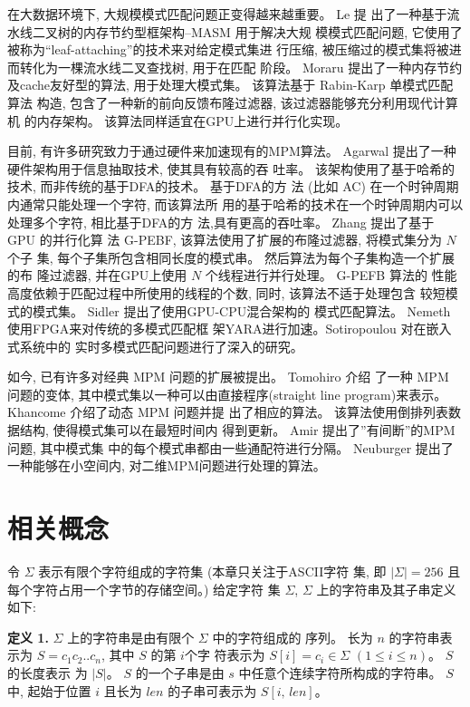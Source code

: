 在大数据环境下, 大规模模式匹配问题正变得越来越重要。 Le \cite{Le2013}提
出了一种基于流水线二叉树的内存节约型框架构--\textsf{MASM} 用于解决大规
模模式匹配问题, 它使用了被称为“leaf-attaching”的技术来对给定模式集进
行压缩, 被压缩过的模式集将被进而转化为一棵流水线二叉查找树, 用于在匹配
阶段。 Moraru \cite{Moraru2012} 提出了一种内存节约及cache友好型的算法,
用于处理大模式集。 该算法基于 Rabin-Karp \cite{Karp1987} 单模式匹配算法
构造, 包含了一种新的前向反馈布隆过滤器, 该过滤器能够充分利用现代计算机
的内存架构。 该算法同样适宜在GPU上进行并行化实现。

目前, 有许多研究致力于通过硬件来加速现有的MPM算法。 Agarwal
\cite{Agarwal2013} 提出了一种硬件架构用于信息抽取技术, 使其具有较高的吞
吐率。 该架构使用了基于哈希的技术, 而非传统的基于DFA的技术。 基于DFA的方
法 (比如 \textsf{AC}) 在一个时钟周期内通常只能处理一个字符, 而该算法所
用的基于哈希的技术在一个时钟周期内可以处理多个字符, 相比基于DFA的方
法,具有更高的吞吐率。 Zhang \cite{Zhang2015} 提出了基于 GPU 的并行化算
法 \textsf{G-PEBF}, 该算法使用了扩展的布隆过滤器, 将模式集分为 $N$ 个子
集, 每个子集所包含相同长度的模式串。 然后算法为每个子集构造一个扩展的布
隆过滤器, 并在GPU上使用 $N$ 个线程进行并行处理。 \textsf{G-PEFB} 算法的
性能高度依赖于匹配过程中所使用的线程的个数, 同时, 该算法不适于处理包含
较短模式的模式集。 Sidler \cite{Sidler2017} 提出了使用GPU-CPU混合架构的
模式匹配算法。 Nemeth \cite{Nemeth2016} 使用FPGA来对传统的多模式匹配框
架YARA进行加速。Sotiropoulou \cite{Sotiropoulou2017} 对在嵌入式系统中的
实时多模式匹配问题进行了深入的研究。

如今, 已有许多对经典 MPM 问题的扩展被提出。 Tomohiro \cite{I2015} 介绍
了一种 MPM 问题的变体, 其中模式集以一种可以由直接程序(straight line
program)来表示。  Khancome \cite{Khancome2013} 介绍了动态 MPM 问题并提
出了相应的算法。 该算法使用倒排列表数据结构, 使得模式集可以在最短时间内
得到更新。 Amir \cite{Amir2015} 提出了”有间断”的MPM 问题, 其中模式集
中的每个模式串都由一些通配符进行分隔。 Neuburger \cite{Neuburger2012}
提出了一种能够在小空间内, 对二维MPM问题进行处理的算法。

\section{相关概念}
\label{sec:notations}

令 $\Sigma$ 表示有限个字符组成的字符集 (本章只关注于ASCII字符
集, 即 $|\Sigma| = 256$ 且每个字符占用一个字节的存储空间。)  给定字符
集 $\Sigma$, $\Sigma$ 上的字符串及其子串定义如下:

\textbf{定义 1.}  $\Sigma$ 上的字符串是由有限个 $\Sigma$ 中的字符组成的
序列。 长为 $n$ 的字符串表示为 $S = c_1c_2..c_n$, 其中 $S$ 的第 $i$个字
符表示为 $S[i] = c_i \in \Sigma$ $(1 \leq i \leq n)$。  $S$ 的长度表示
为 $|S|$。 $S$ 的一个子串是由 $s$ 中任意个连续字符所构成的字符串。  $S$中,
起始于位置 $i$ 且长为 $len$ 的子串可表示为 $S[i,\,len]$。

